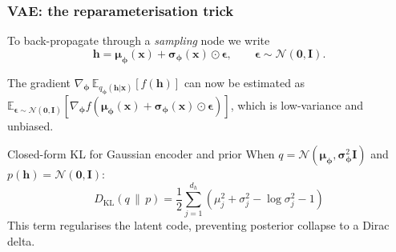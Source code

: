 \documentclass{beamer}
\newcommand{\E}{\mathbb{E}}
\newcommand{\DKL}{D_{\mathrm{KL}}}
\newcommand{\Norm}{\mathcal{N}}
\begin{document}
\begin{frame}
\frametitle{VAE: the reparameterisation trick}

To back-propagate through a \emph{sampling} node we write
\[
  \bm{h} = \bm{\mu}_{\bm{\phi}}(\bm{x})
           + \bm{\sigma}_{\bm{\phi}}(\bm{x})\odot\bm{\epsilon},
  \qquad \bm{\epsilon}\sim\Norm(\bm{0},\mathbf{I}).
\]

The gradient
$\nabla_{\bm{\phi}}\,\E_{q_{\bm{\phi}}(\bm{h}|\bm{x})}[f(\bm{h})]$
can now be estimated as
$\E_{\bm{\epsilon}\sim\Norm(\bm{0},\mathbf{I})}\!\left[\nabla_{\bm{\phi}}
  f\!\left(\bm{\mu}_{\bm{\phi}}(\bm{x})
    +\bm{\sigma}_{\bm{\phi}}(\bm{x})\odot\bm{\epsilon}\right)\right]$,
which is low-variance and unbiased.

\begin{block}{Closed-form KL for Gaussian encoder and prior}
When $q = \Norm(\bm{\mu}_{\bm{\phi}},\bm{\sigma}^2_{\bm{\phi}}\mathbf{I})$
and $p(\bm{h}) = \Norm(\bm{0},\mathbf{I})$:
\[
  \DKL(q\,\|\,p)
  = \frac{1}{2}\sum_{j=1}^{d_h}\!\left(
    \mu_j^2 + \sigma_j^2 - \log\sigma_j^2 - 1\right)
\]
This term regularises the latent code, preventing posterior collapse to a
Dirac delta.
\end{block}
\end{frame}
\end{document}
